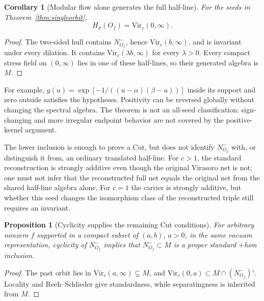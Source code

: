 \documentclass[12pt]{article}
\newtheorem{proposition}[theorem]{Proposition}
\newtheorem{corollary}[theorem]{Corollary}
\theoremstyle{definition}
\theoremstyle{remark}
\begin{document}
\begin{corollary}[Modular flow alone generates the full half-line]\label{cor:modonly}
For the seeds in Theorem~\ref{thm:singleorbit},
\[
 H_\sigma(O_f)=\mathrm{Vir}_c(0,\infty).
\]
\end{corollary}
\begin{proof}
The two-sided hull contains \(N^-_{O_f}\), hence
\(\mathrm{Vir}_c(b,\infty)\), and is invariant under every dilation. It contains
\(\mathrm{Vir}_c(\lambda b,\infty)\) for every \(\lambda>0\).
Every compact stress field on \((0,\infty)\) lies in one of these half-lines,
so their generated algebra is \(M\).
\end{proof}

For example, \(g(u)=\exp[-1/((u-\alpha)(\beta-u))]\) inside its support and
zero outside satisfies the hypotheses. Positivity can be reversed globally
without changing the spectral algebra. The theorem is not an all-seed
classification: sign-changing and more irregular endpoint behavior are not
covered by the positive-kernel argument.

The lower inclusion is enough to prove a Cut, but does not identify
\(N^-_{O_f}\) with, or distinguish it from, an ordinary translated half-line.
For \(c>1\), the standard reconstruction is strongly additive even though the
original Virasoro net is not; one must not infer that the reconstructed full
net equals the original net from the shared half-line algebra alone.
For \(c=1\) the carrier is strongly additive, but whether this seed changes the
isomorphism class of the reconstructed triple still requires an invariant.

\begin{proposition}[Cyclicity supplies the remaining Cut conditions]\label{prop:standard}
For arbitrary nonzero \(f\) supported in a compact subset of \((a,b)\),
\(a>0\), in the same vacuum representation, cyclicity of \(N^-_{O_f}\)
implies that \(N^-_{O_f}\subset M\) is a proper standard \(+\)hsm inclusion.
\end{proposition}
\begin{proof}
The past orbit lies in \(\mathrm{Vir}_c(a,\infty)\subsetneq M\), and
\(\mathrm{Vir}_c(0,a)\subset M\cap(N^-_{O_f})'\). Locality and
Reeh--Schlieder give standardness, while separatingness is inherited from \(M\).
\end{proof}
\end{document}
